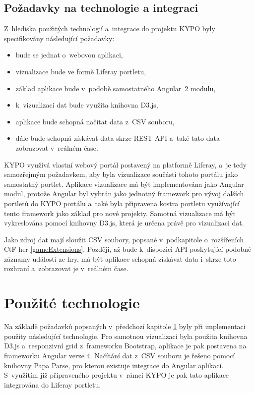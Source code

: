 \documentclass[
  digital, %
  oneside, %
  table,   %
  nolof,     %
  nolot,     %
]{fithesis3}
\begin{document}
\section{Požadavky na technologie a integraci} \label{technologyRequirements}
Z~hlediska použitých technologií a~integrace do projektu KYPO byly specifikovány následující požadavky:
\begin{itemize}
  \item bude se jednat o~webovou aplikaci,
  \item vizualizace bude ve formě Liferay portletu,
  \item základ aplikace bude v~podobě samostatného Angular~2 modulu,
  \item k~vizualizaci dat bude využita knihovna D3.js,
  \item aplikace bude schopná načítat data z~CSV souboru,
  \item dále bude schopná získávat data skrze REST API a~také tato data zobrazovat v~reálném čase.
\end{itemize}
KYPO využívá vlastní webový portál postavený na platformě Liferay, a~je tedy samozřejmým požadavkem, aby byla vizualizace součástí tohoto portálu jako samostatný portlet. Aplikace vizualizace má být implementována jako Angular modul, protože Angular byl vybrán jako jednotný framework pro vývoj dalších portletů do KYPO portálu a~také byla připravena kostra portletu využívající tento framework jako základ pro nové projekty. Samotná vizualizace má být vykreslována pomocí knihovny D3.js, která je určena právě pro vizualizaci dat.\par
Jako zdroj dat mají sloužit CSV soubory, popsané v~podkapitole o~rozšířeních CtF her \ref{gameExtensions}. Později, až bude k~dispozici API poskytující podobné záznamy událostí ze hry, má být aplikace schopná získávat data i~skrze toto rozhraní a~zobrazovat je v~reálném čase.

\chapter{Použité technologie}
Na základě požadavků popsaných v~předchozí kapitole \ref{technologyRequirements} byly při implementaci použity následující technologie. Pro samotnou vizualizaci byla použita knihovna D3.js a~responzivní grid z~frameworku Bootstrap, aplikace je pak postavena na frameworku Angular verze 4. Načítání dat z~CSV souboru je řešeno pomocí knihovny Papa Parse, pro kterou existuje integrace do Angular aplikací. S~využitím již připraveného projektu v~rámci KYPO je pak tato aplikace integrována do Liferay portletu.
\end{document}
